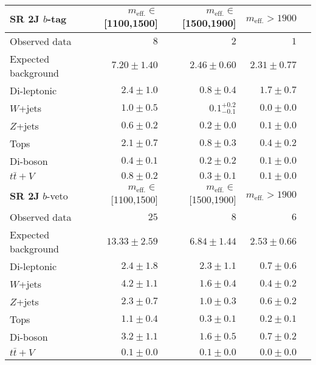 \begin{tabular*}{\textwidth}{@{\extracolsep{\fill}}lrrrr}
\toprule
\textbf{SR 2J} $b$-tag & $m_{\mathrm{eff.}}\in$[1100,1500] & $m_{\mathrm{eff.}}\in$[1500,1900] & $m_{\mathrm{eff.}}>1900$ \\
\midrule

Observed data          & $8$              & $2$              & $1$                    \\
\midrule
Expected background         & $7.20 \pm 1.40$          & $2.46 \pm 0.60$          & $2.31 \pm 0.77$              \\
\midrule
        Di-leptonic         & $2.4 \pm 1.0$          & $0.8 \pm 0.4$          & $1.7 \pm 0.7$              \\
        $W$+jets         & $1.0 \pm 0.5$          & $0.1_{-0.1}^{+0.2}$          & $0.0 \pm 0.0$              \\
        $Z$+jets         & $0.6 \pm 0.2$          & $0.2 \pm 0.0$          & $0.1 \pm 0.0$              \\
        Tops         & $2.1 \pm 0.7$          & $0.8 \pm 0.3$          & $0.4 \pm 0.2$              \\
        Di-boson         & $0.4 \pm 0.1$          & $0.2 \pm 0.2$          & $0.1 \pm 0.0$              \\
        $t\bar{t}+V$         & $0.8 \pm 0.2$          & $0.3 \pm 0.1$          & $0.1 \pm 0.0$              \\
\toprule
\textbf{SR 2J} $b$-veto & $m_{\mathrm{eff.}}\in$[1100,1500] & $m_{\mathrm{eff.}}\in$[1500,1900] & $m_{\mathrm{eff.}}>1900$ \\
\midrule
Observed data          & $25$              & $8$              & $6$                    \\
\midrule
Expected background         & $13.33 \pm 2.59$          & $6.84 \pm 1.44$          & $2.53 \pm 0.66$              \\
\midrule
        Di-leptonic         & $2.4 \pm 1.8$          & $2.3 \pm 1.1$          & $0.7 \pm 0.6$              \\
        $W$+jets         & $4.2 \pm 1.1$          & $1.6 \pm 0.4$          & $0.4 \pm 0.2$              \\
        $Z$+jets         & $2.3 \pm 0.7$          & $1.0 \pm 0.3$          & $0.6 \pm 0.2$              \\
        Tops         & $1.1 \pm 0.4$          & $0.3 \pm 0.1$          & $0.2 \pm 0.1$              \\
        Di-boson         & $3.2 \pm 1.1$          & $1.6 \pm 0.5$          & $0.7 \pm 0.2$              \\
        $t\bar{t}+V$         & $0.1 \pm 0.0$          & $0.1 \pm 0.0$          & $0.0 \pm 0.0$              \\


\bottomrule
\end{tabular*}




